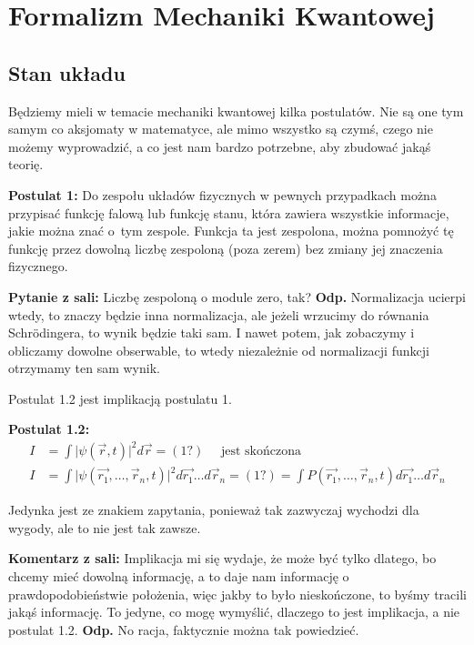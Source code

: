 \section{Formalizm Mechaniki Kwantowej}
\subsection{Stan układu}
Będziemy mieli w temacie mechaniki kwantowej kilka postulatów. Nie są one tym samym co aksjomaty w matematyce, ale mimo wszystko są czymś, czego nie możemy wyprowadzić, a co jest nam bardzo potrzebne, aby zbudować jakąś teorię.

\textbf{Postulat 1:} Do zespołu układów fizycznych w pewnych przypadkach można przypisać funkcję falową lub funkcję stanu, która zawiera wszystkie informacje, jakie można znać o~tym zespole. Funkcja ta jest zespolona, można pomnożyć tę funkcję przez dowolną liczbę zespoloną (poza zerem) bez zmiany jej znaczenia fizycznego.

\textbf{Pytanie z sali:} Liczbę zespoloną o module zero, tak? \textbf{Odp.} Normalizacja ucierpi wtedy, to znaczy będzie inna normalizacja, ale jeżeli wrzucimy do równania Schrödingera, to wynik będzie taki sam. I nawet potem, jak zobaczymy i obliczamy dowolne obserwable, to wtedy niezależnie od normalizacji funkcji otrzymamy ten sam wynik.

Postulat 1.2 jest implikacją postulatu 1.

\textbf{Postulat 1.2:}
\begin{equation*}
	\begin{split}
		I &= \int \vert \psi(\vec{r}, t)\vert^2 d\vec{r} = (1?) \quad \text{ jest skończona} \\
		I &= \int \vert \psi (\vec{r_1}, \dots, \vec{r}_n, t)\vert^2 d\vec{r_1}\dots d\vec{r}_n = (1?) = \int P(\vec{r_1}, \dots, \vec{r}_n, t)d\vec{r_1}\dots d\vec{r}_n
	\end{split}
\end{equation*}

Jedynka jest ze znakiem zapytania, ponieważ tak zazwyczaj wychodzi dla wygody, ale to nie jest tak zawsze.

\textbf{Komentarz z sali:} Implikacja mi się wydaje, że może być tylko dlatego, bo chcemy mieć dowolną informację, a to daje nam informację o prawdopodobieństwie położenia, więc jakby to było nieskończone, to byśmy tracili jakąś informację. To jedyne, co mogę wymyślić, dlaczego to jest implikacja, a nie postulat 1.2. \textbf{Odp.} No racja, faktycznie można tak powiedzieć.

